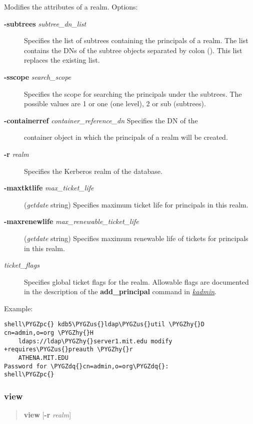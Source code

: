\documentclass[letterpaper,10pt,english]{sphinxmanual}
\def\PYGZus{\char`\_}
\def\PYGZpc{\char`\%}
\def\PYGZhy{\char`\-}
\def\PYGZdq{\char`\"}
\begin{document}
Modifies the attributes of a realm.  Options:
\begin{description}
\item[{\textbf{-subtrees} \emph{subtree\_dn\_list}}] \leavevmode
Specifies the list of subtrees containing the principals of a
realm.  The list contains the DNs of the subtree objects separated
by colon (\code{:}).  This list replaces the existing list.

\item[{\textbf{-sscope} \emph{search\_scope}}] \leavevmode
Specifies the scope for searching the principals under the
subtrees.  The possible values are 1 or one (one level), 2 or sub
(subtrees).

\item[{\textbf{-containerref} \emph{container\_reference\_dn} Specifies the DN of the}] \leavevmode
container object in which the principals of a realm will be
created.

\item[{\textbf{-r} \emph{realm}}] \leavevmode
Specifies the Kerberos realm of the database.

\item[{\textbf{-maxtktlife} \emph{max\_ticket\_life}}] \leavevmode
(\emph{getdate} string) Specifies maximum ticket life for
principals in this realm.

\item[{\textbf{-maxrenewlife} \emph{max\_renewable\_ticket\_life}}] \leavevmode
(\emph{getdate} string) Specifies maximum renewable life of
tickets for principals in this realm.

\item[{\emph{ticket\_flags}}] \leavevmode
Specifies global ticket flags for the realm.  Allowable flags are
documented in the description of the \textbf{add\_principal} command in
{\hyperref[admin/admin_commands/kadmin_local:kadmin-1]{\emph{kadmin}}}.

\end{description}

Example:

\begin{Verbatim}[commandchars=\\\{\}]
shell\PYGZpc{} kdb5\PYGZus{}ldap\PYGZus{}util \PYGZhy{}D cn=admin,o=org \PYGZhy{}H
    ldaps://ldap\PYGZhy{}server1.mit.edu modify +requires\PYGZus{}preauth \PYGZhy{}r
    ATHENA.MIT.EDU
Password for \PYGZdq{}cn=admin,o=org\PYGZdq{}:
shell\PYGZpc{}
\end{Verbatim}


\subsubsection{view}
\label{admin/admin_commands/kdb5_ldap_util:kdb5-ldap-util-modify-end}\label{admin/admin_commands/kdb5_ldap_util:view}\label{admin/admin_commands/kdb5_ldap_util:kdb5-ldap-util-view}\begin{quote}

\textbf{view} {[}\textbf{-r} \emph{realm}{]}
\end{quote}
\end{document}
